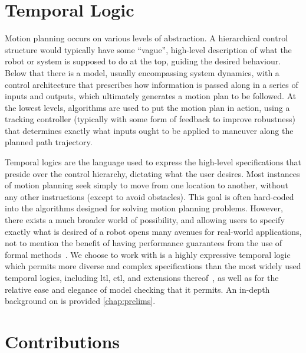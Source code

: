 \section{Temporal Logic}


Motion planning occurs on various levels of abstraction. A hierarchical control structure would typically have some ``vague'', high-level description of what the robot or system is supposed to do at the top, guiding the desired behaviour. Below that there is a model, usually encompassing system dynamics, with a control architecture that prescribes how information is passed along in a series of inputs and outputs, which ultimately generates a motion plan to be followed. At the lowest levels, algorithms are used to put the motion plan in action, using a tracking controller (typically with some form of feedback to improve robustness) that determines exactly what inputs ought to be applied to maneuver along the planned path trajectory.

Temporal logics are the language used to express the high-level specifications that preside over the control hierarchy, dictating what the user desires. Most instances of motion planning seek simply to move from one location to another, without any other instructions (except to avoid obstacles). This goal is often hard-coded into the algorithms designed for solving motion planning problems. However, there exists a much broader world of possibility, and allowing users to specify exactly what is desired of a robot opens many avenues for real-world applications, not to mention the benefit of having performance guarantees from the use of formal methods~\cite{Lin2014}. We choose to work with \mucalc{} is a highly expressive temporal logic which permits more diverse and complex specifications than the most widely used temporal logics, including \gls{ltl}, \gls{ctl}, and extensions thereof~\cite{Karaman2009}, as well as for the relative ease and elegance of model checking that it permits. An in-depth background on \mucalc{} is provided \autoref{chap:prelims}.



\section{Contributions}

